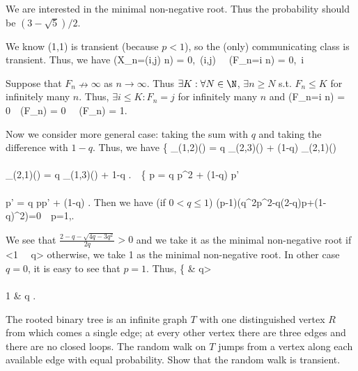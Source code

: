 We are interested in the minimal non-negative root. Thus the probability should be $(3-\sqrt{5})/2$.

We know (1,1) is transient (because $p<1$), so the (only) communicating class is transient. Thus, we have
\be
\pro(X_n=(i,j) n) = 0,\ \forall (i,j) \ \ra \ \pro(F_n=i n) = 0,\ \forall i
\ee

Suppose that $F_n\nrightarrow\infty$ as $n\to \infty$. Thus $\exists K:\forall N\in\N$, $\exists n\geq N$ s.t. $F_n\leq K$ for infinitely many $n$. Thus, $\exists i\leq K: F_n=j$ for infinitely many $n$ and
\be
\pro(F_n=i n) = 0\ \ra \ \pro(F_n\nrightarrow \infty) = 0 \ \ra \ \pro(F_n\to \infty) = 1.
\ee

Now we consider more general case: taking the sum with $q$ and taking the difference with $1-q$. Thus, we have
\be
\left\{
\pro_{(1,2)}() = q \pro_{(2,3)}() + (1-q) \pro_{(2,1)}() \\
\\
\pro_{(2,1)}() = q \pro_{(1,3)}() + 1-q
\ea\right.\ \ra \
\left\{
p = q p^2 + (1-q) p'\\
\\
p' = q pp' + (1-q)
\ea\right.
\ee
Then we have (if $0<q\leq 1$)
\be
(p-1)(q^2p^2-q(2-q)p+(1-q)^2)=0\ \ra \ p=1,.
\ee

We see that $\frac {2-q-\sqrt{4q-3q^2}}{2q}>0$ and we take it as the minimal non-negative root if
\be
{}<1 \ \ra \ q>
\ee
otherwise, we take 1 as the minimal non-negative root. In other case $q=0$, it is easy to see that $p=1$. Thus,
\be
\left\{
 \quad\quad & q>\\
\\
1 & q \leq {}
\ea\right.
\ee

\vspace{2mm}


\begin{exercise}
The rooted binary tree is an infinite graph $T$ with one distinguished vertex $R$ from which comes a single edge; at every other vertex there are three edges and there are no closed loops. The random walk on $T$ jumps from a vertex along each available edge with equal probability. Show that the random walk is transient.
\end{exercise}

